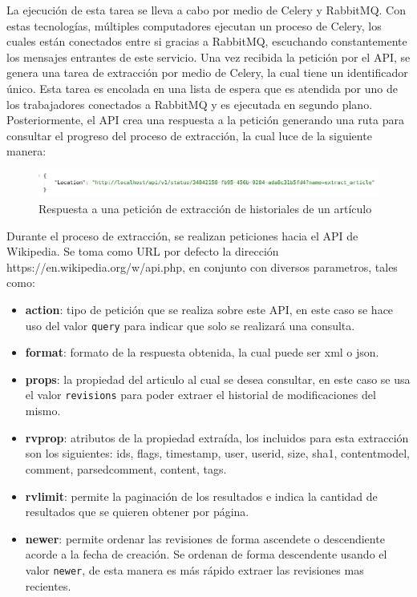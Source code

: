 La ejecución de esta tarea se lleva a cabo por medio de Celery y RabbitMQ.
Con estas tecnologías, múltiples computadores ejecutan un proceso de Celery, los
cuales están conectados entre si gracias a RabbitMQ, escuchando constantemente los mensajes entrantes de este servicio.
Una vez recibida la petición por el API, se genera una tarea de extracción por medio de Celery, la cual tiene un identificador único. Esta tarea es encolada en una lista de
espera que es atendida por uno de los trabajadores conectados a RabbitMQ y es ejecutada en segundo plano.
Posteriormente, el API crea una respuesta a la petición generando una ruta para consultar el progreso
del proceso de extracción, la cual luce de la siguiente manera:

\begin{figure}[H]
	\centering
		\includegraphics[width=1\textwidth]{figures/extract_response}
	\caption{Respuesta a una petición de extracción de historiales de un artículo}
	\label{fig:extract_response}
\end{figure}

Durante el proceso de extracción, se realizan peticiones hacia el API de Wikipedia.
Se toma como URL por defecto la dirección https://en.wikipedia.org/w/api.php, en conjunto con diversos parametros, tales como:

\begin{itemize}
	\item \textbf{action}: tipo de petición que se realiza sobre este API, en este caso se hace uso del valor \texttt{query} para indicar que solo se realizará una consulta.

	\item \textbf{format}: formato de la respuesta obtenida, la cual puede ser xml o json.

	\item \textbf{props}: la propiedad del articulo al cual se desea consultar, en este caso se usa el valor \texttt{revisions} para poder extraer el historial de modificaciones del mismo.

	\item \textbf{rvprop}: atributos de la propiedad extraída, los incluidos para esta extracción son los siguientes: ids, flags, timestamp, user, userid, size, sha1, contentmodel, comment, parsedcomment, content, tags.

	\item \textbf{rvlimit}: permite la paginación de los resultados e indica la cantidad de resultados que se quieren obtener por página.

	\item \textbf{newer}: permite ordenar las revisiones de forma ascendete o descendiente acorde a la fecha de creación. Se ordenan de forma descendente usando el valor \texttt{newer}, de esta manera es más rápido extraer las revisiones mas recientes.
\end{itemize}


